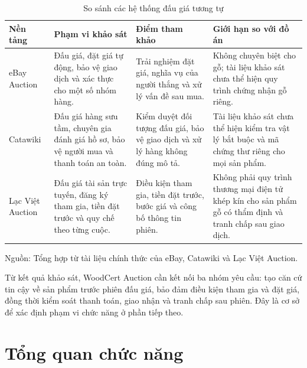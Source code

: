 \documentclass[../DoAn.tex]{subfiles}
\begin{document}
\begin{table}[htbp]
    \centering
    \caption{So sánh các hệ thống đấu giá tương tự}
    \label{tab:similar-auction-systems}
    \footnotesize
    \setlength{\tabcolsep}{3pt}
    \renewcommand{\arraystretch}{1.05}
    \begin{tabular}{|>{\raggedright\arraybackslash}p{}|>{\raggedright\arraybackslash}p{}|>{\raggedright\arraybackslash}p{}|>{\raggedright\arraybackslash}p{}|}
        \hline
        \textbf{Nền tảng} & \textbf{Phạm vi khảo sát} & \textbf{Điểm tham khảo} & \textbf{Giới hạn so với đồ án} \\
        \hline
        eBay Auction & Đấu giá, đặt giá tự động, bảo vệ giao dịch và xác thực cho một số nhóm hàng. & Trải nghiệm đặt giá, nghĩa vụ của người thắng và xử lý vấn đề sau mua. & Không chuyên biệt cho gỗ; tài liệu khảo sát chưa thể hiện quy trình chứng nhận gỗ riêng. \\
        \hline
        Catawiki & Đấu giá hàng sưu tầm, chuyên gia đánh giá hồ sơ, bảo vệ người mua và thanh toán an toàn. & Kiểm duyệt đối tượng đấu giá, bảo vệ giao dịch và xử lý hàng không đúng mô tả. & Tài liệu khảo sát chưa thể hiện kiểm tra vật lý bắt buộc và mã chứng thư riêng cho mọi sản phẩm. \\
        \hline
        Lạc Việt Auction & Đấu giá tài sản trực tuyến, đăng ký tham gia, tiền đặt trước và quy chế theo từng cuộc. & Điều kiện tham gia, tiền đặt trước, bước giá và công bố thông tin phiên. & Không phải quy trình thương mại điện tử khép kín cho sản phẩm gỗ có thẩm định và tranh chấp sau giao dịch. \\
        \hline
    \end{tabular}
    \vspace{2pt}
    \parbox{0.95\textwidth}{\footnotesize Nguồn: Tổng hợp từ tài liệu chính thức của eBay, Catawiki và Lạc Việt Auction.}
\end{table}

Từ kết quả khảo sát, WoodCert Auction cần kết nối ba nhóm yêu cầu: tạo căn cứ tin cậy về sản phẩm trước phiên đấu giá, bảo đảm điều kiện tham gia và đặt giá, đồng thời kiểm soát thanh toán, giao nhận và tranh chấp sau phiên. Đây là cơ sở để xác định phạm vi chức năng ở phần tiếp theo.

\FloatBarrier

\section{Tổng quan chức năng}
\label{section:2.2}
\end{document}
